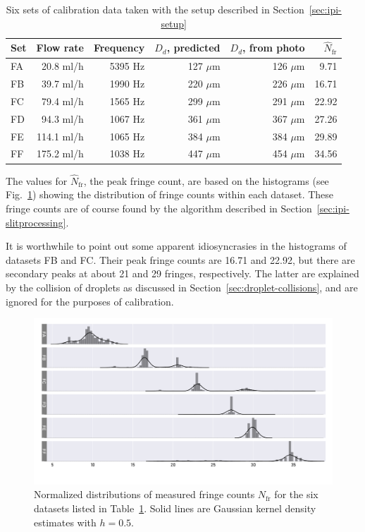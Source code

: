 \documentclass[11.5pt]{book}
\newcommand*{\figref}[1]{Fig.~\ref{#1}}
\newcommand*{\secref}[1]{Section~\ref{#1}}
\newcommand*{\tableref}[1]{Table~\ref{#1}}
\begin{document}
\begin{table}[h!]
    \centering
    \begin{tabular}{lrrrrr}
    \toprule
    Set & Flow rate & Frequency & $D_d$, predicted  & $D_d$, from
photo & $\hat{N}_\text{fr}$ \\
    \midrule
    FA & 20.8  ml/h  & 5395 Hz  & 127 $\mu$m  & 126 $\mu$m &  9.71      \\
    FB & 39.7  ml/h  & 1990 Hz  & 220 $\mu$m  & 226 $\mu$m &  16.71     \\
    FC & 79.4  ml/h  & 1565 Hz  & 299 $\mu$m  & 291 $\mu$m &  22.92     \\
    FD & 94.3  ml/h  & 1067 Hz  & 361 $\mu$m  & 367 $\mu$m &  27.26     \\
    FE & 114.1 ml/h  & 1065 Hz  & 384 $\mu$m  & 384 $\mu$m &  29.89     \\
    FF & 175.2 ml/h  & 1038 Hz  & 447 $\mu$m  & 454 $\mu$m &  34.56     \\
    \bottomrule
\end{tabular}
\caption{Six sets of calibration data taken with the setup described in \secref{sec:ipi-setup}}
\label{tab:ipi-calibration-datasets}
\end{table}
The values for $\hat{N}_\text{fr}$, the peak fringe count, are based on the
histograms (see \figref{fig:fringe-histograms}) showing the distribution of
fringe counts within each dataset. These fringe counts are of course found by
the algorithm described in \secref{sec:ipi-slitprocessing}.

It is worthwhile to point out some apparent idiosyncrasies in the histograms of
datasets FB and FC. Their peak fringe counts are 16.71 and 22.92, but there are
secondary peaks at about 21 and 29 fringes, respectively. The latter are
explained by the collision of droplets as discussed in
\secref{sec:droplet-collisions}, and are ignored for the purposes of
calibration.

\begin{figure}
    \centering
    \includegraphics[width=\textwidth]{img/fringe_histogram.pdf}
    \caption{Normalized distributions of measured fringe counts $N_\text{fr}$
        for the six datasets listed in \tableref{tab:ipi-calibration-datasets}. Solid lines are
Gaussian kernel density estimates with $h=0.5$. }
    \label{fig:fringe-histograms}
\end{figure}
\end{document}
